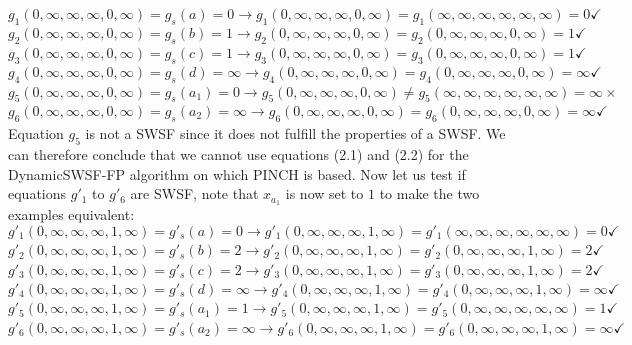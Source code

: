 $g_1(0,\infty,\infty,\infty,0,\infty) = g_s(a) = 0 \xrightarrow[\text{}]{\text{}} g_1(0,\infty,\infty,\infty,0,\infty) = g_1(\infty,\infty,\infty,\infty,\infty,\infty) = 0 \checkmark$\\
$g_2(0,\infty,\infty,\infty,0,\infty) = g_s(b) = 1 \xrightarrow[\text{}]{\text{}} g_2(0,\infty,\infty,\infty,0,\infty) = g_2(0,\infty,\infty,\infty,0,\infty) = 1 \checkmark$\\
$g_3(0,\infty,\infty,\infty,0,\infty) = g_s(c) = 1 \xrightarrow[\text{}]{\text{}} g_3(0,\infty,\infty,\infty,0,\infty) = g_3(0,\infty,\infty,\infty,0,\infty) = 1 \checkmark$\\
$g_4(0,\infty,\infty,\infty,0,\infty) = g_s(d) = \infty \xrightarrow[\text{}]{\text{}} g_4(0,\infty,\infty,\infty,0,\infty) = g_4(0,\infty,\infty,\infty,0,\infty) = \infty \checkmark$\\
$g_5(0,\infty,\infty,\infty,0,\infty) = g_s(a_1) = 0 \xrightarrow[\text{}]{\text{}} g_5(0,\infty,\infty,\infty,0,\infty) \neq g_5(\infty,\infty,\infty,\infty,\infty,\infty) = \infty \times$\\
$g_6(0,\infty,\infty,\infty,0,\infty) = g_s(a_2) = \infty \xrightarrow[\text{}]{\text{}} g_6(0,\infty,\infty,\infty,0,\infty) = g_6(0,\infty,\infty,\infty,0,\infty) = \infty \checkmark$\\

Equation $g_5$ is not a SWSF since it does not fulfill the properties of a SWSF. We can therefore conclude that we cannot use equations (2.1) and (2.2) for the DynamicSWSF-FP algorithm on which PINCH is based. Now let us test if equations $g'_1$ to $g'_6$ are SWSF, note that $x_a_1$ is now set to $1$ to make the two examples equivalent:\\

$g'_1(0,\infty,\infty,\infty,1,\infty) = g'_s(a) = 0 \xrightarrow[\text{}]{\text{}} g'_1(0,\infty,\infty,\infty,1,\infty) = g'_1(\infty,\infty,\infty,\infty,\infty,\infty)  = 0 \checkmark$\\
$g'_2(0,\infty,\infty,\infty,1,\infty) = g'_s(b) = 2 \xrightarrow[\text{}]{\text{}} g'_2(0,\infty,\infty,\infty,1,\infty) = g'_2(0,\infty,\infty,\infty,1,\infty) = 2 \checkmark$\\
$g'_3(0,\infty,\infty,\infty,1,\infty) = g'_s(c) = 2 \xrightarrow[\text{}]{\text{}} g'_3(0,\infty,\infty,\infty,1,\infty) = g'_3(0,\infty,\infty,\infty,1,\infty) = 2 \checkmark$\\
$g'_4(0,\infty,\infty,\infty,1,\infty) = g'_s(d) = \infty \xrightarrow[\text{}]{\text{}} g'_4(0,\infty,\infty,\infty,1,\infty) = g'_4(0,\infty,\infty,\infty,1,\infty) = \infty \checkmark$\\
$g'_5(0,\infty,\infty,\infty,1,\infty) = g'_s(a_1) = 1 \xrightarrow[\text{}]{\text{}} g'_5(0,\infty,\infty,\infty,1,\infty) = g'_5(0,\infty,\infty,\infty,\infty,\infty) = 1 \checkmark$\\
$g'_6(0,\infty,\infty,\infty,1,\infty) = g'_s(a_2) = \infty \xrightarrow[\text{}]{\text{}} g'_6(0,\infty,\infty,\infty,1,\infty) = g'_6(0,\infty,\infty,\infty,1,\infty) = \infty \checkmark$\\


